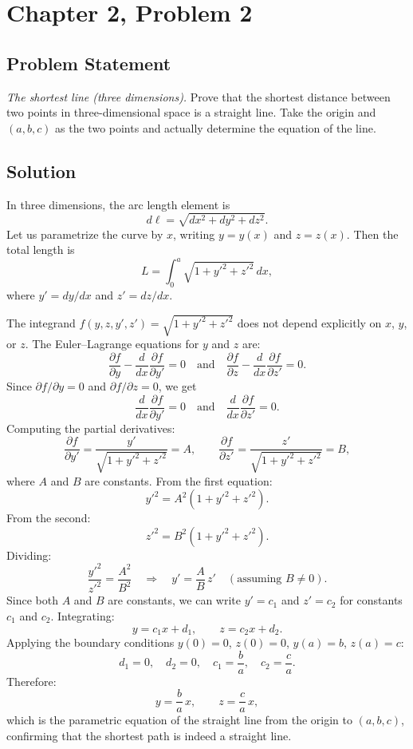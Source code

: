 \documentclass[12pt]{article}
\begin{document}
\section*{Chapter 2, Problem 2}

\subsection*{Problem Statement}
\textit{The shortest line (three dimensions).} Prove that the shortest distance between two points in three-dimensional space is a straight line. Take the origin and $(a, b, c)$ as the two points and actually determine the equation of the line.

\subsection*{Solution}

In three dimensions, the arc length element is
\[
  d\ell = \sqrt{dx^2 + dy^2 + dz^2}.
\]
Let us parametrize the curve by $x$, writing $y = y(x)$ and $z = z(x)$. Then the total length is
\[
  L = \int_0^a \sqrt{1 + y'^2 + z'^2}\,dx,
\]
where $y' = dy/dx$ and $z' = dz/dx$.

The integrand $f(y, z, y', z') = \sqrt{1 + y'^2 + z'^2}$ does not depend explicitly on $x$, $y$, or $z$. The Euler--Lagrange equations for $y$ and $z$ are:
\[
  \frac{\partial f}{\partial y} - \frac{d}{dx}\frac{\partial f}{\partial y'} = 0
  \quad \text{and} \quad
  \frac{\partial f}{\partial z} - \frac{d}{dx}\frac{\partial f}{\partial z'} = 0.
\]
Since $\partial f/\partial y = 0$ and $\partial f/\partial z = 0$, we get
\[
  \frac{d}{dx}\frac{\partial f}{\partial y'} = 0
  \quad \text{and} \quad
  \frac{d}{dx}\frac{\partial f}{\partial z'} = 0.
\]
Computing the partial derivatives:
\[
  \frac{\partial f}{\partial y'} = \frac{y'}{\sqrt{1 + y'^2 + z'^2}} = A,
  \qquad
  \frac{\partial f}{\partial z'} = \frac{z'}{\sqrt{1 + y'^2 + z'^2}} = B,
\]
where $A$ and $B$ are constants. From the first equation:
\[
  y'^2 = A^2(1 + y'^2 + z'^2).
\]
From the second:
\[
  z'^2 = B^2(1 + y'^2 + z'^2).
\]
Dividing:
\[
  \frac{y'^2}{z'^2} = \frac{A^2}{B^2}
  \quad \Longrightarrow \quad
  y' = \frac{A}{B}\,z' \quad (\text{assuming } B \neq 0).
\]
Since both $A$ and $B$ are constants, we can write $y' = c_1$ and $z' = c_2$ for constants $c_1$ and $c_2$. Integrating:
\[
  y = c_1 x + d_1, \qquad z = c_2 x + d_2.
\]
Applying the boundary conditions $y(0) = 0$, $z(0) = 0$, $y(a) = b$, $z(a) = c$:
\[
  d_1 = 0, \quad d_2 = 0, \quad c_1 = \frac{b}{a}, \quad c_2 = \frac{c}{a}.
\]
Therefore:
\[
  \boxed{y = \frac{b}{a}\,x, \qquad z = \frac{c}{a}\,x,}
\]
which is the parametric equation of the straight line from the origin to $(a, b, c)$, confirming that the shortest path is indeed a straight line.
\end{document}

